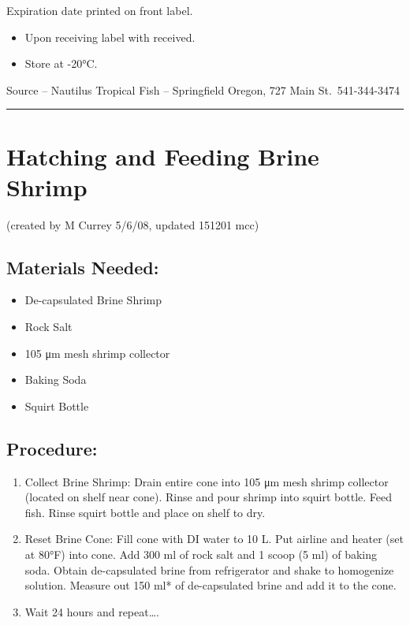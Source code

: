 \documentclass[
]{book}
\providecommand{\tightlist}{%
  \setlength{\itemsep}{0pt}\setlength{\parskip}{0pt}}
\begin{document}
Expiration date printed on front label.

\begin{itemize}
\tightlist
\item
  Upon receiving label with received.
\item
  Store at -20°C.
\end{itemize}

Source -- Nautilus Tropical Fish -- Springfield Oregon, 727 Main St.~541-344-3474

\begin{center}\rule{0.5\linewidth}{0.5pt}\end{center}

\hypertarget{hatching-and-feeding-brine-shrimp}{%
\section{Hatching and Feeding Brine Shrimp}\label{hatching-and-feeding-brine-shrimp}}

(created by M Currey 5/6/08, updated 151201 mcc)

\hypertarget{materials-needed-1}{%
\subsection{Materials Needed:}\label{materials-needed-1}}

\begin{itemize}
\tightlist
\item
  De-capsulated Brine Shrimp
\item
  Rock Salt
\item
  105 μm mesh shrimp collector
\item
  Baking Soda
\item
  Squirt Bottle
\end{itemize}

\hypertarget{procedure-3}{%
\subsection{Procedure:}\label{procedure-3}}

\begin{enumerate}
\def\labelenumi{\arabic{enumi}.}
\tightlist
\item
  Collect Brine Shrimp: Drain entire cone into 105 μm mesh shrimp collector (located on shelf near cone). Rinse and pour shrimp into squirt bottle. Feed fish. Rinse squirt bottle and place on shelf to dry.
\item
  Reset Brine Cone: Fill cone with DI water to 10 L. Put airline and heater (set at 80°F) into cone. Add 300 ml of rock salt and 1 scoop (5 ml) of baking soda. Obtain de-capsulated brine from refrigerator and shake to homogenize solution. Measure out 150 ml* of de-capsulated brine and add it to the cone.
\item
  Wait 24 hours and repeat\ldots.
\end{enumerate}
\end{document}
